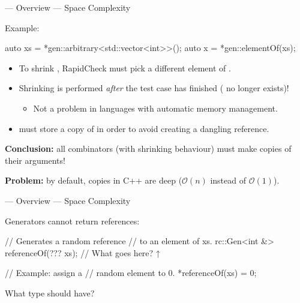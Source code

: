 \begin{frame}[fragile]{\halcheck{} --- Overview --- Space Complexity}
  \begin{block}{Example:}
    \begin{cppcode}
      auto xs = *gen::arbitrary<std::vector<int>>();
      auto x  = *gen::elementOf(xs);
    \end{cppcode}
  \end{block}

  \pause{}

  \vspace{-0.3cm}
  \begin{itemize}
    \item To shrink , RapidCheck must pick a different element of .
          \pause{}

    \item Shrinking is performed \emph{after} the test case has finished (\alert{ no longer exists})!
          \begin{itemize}
            \item Not a problem in languages with automatic memory management.
          \end{itemize}
          \pause{}

    \item {} must store a copy of  in order to avoid creating a dangling reference.
          \pause{}
  \end{itemize}

  \textbf{Conclusion:} all combinators (with shrinking behaviour) must make copies of their arguments!

  \pause{}

  \textbf{Problem:} by default, copies in C++ are deep ($\mathcal{O}(n)$ instead of $\mathcal{O}(1)$).
\end{frame}

\begin{frame}[fragile]{\halcheck{} --- Overview --- Space Complexity}
  \begin{block}{Generators cannot return references:}
    \begin{cppcode}
      // Generates a random reference
      // to an element of xs.
      rc::Gen<int &> referenceOf(??? xs);
      //          What goes here? ↑

      // Example: assign a
      // random element to 0.
      *referenceOf(xs) = 0;
    \end{cppcode}

    What type should  have?
  \end{block}
\end{frame}

